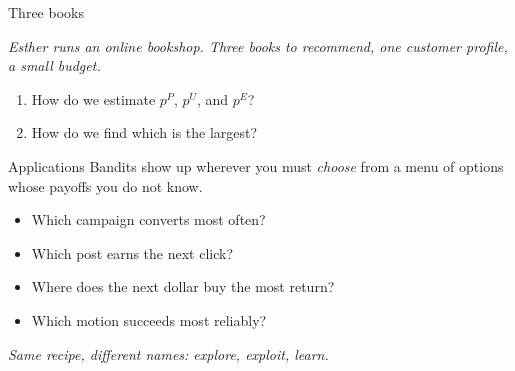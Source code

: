 \begin{frame}{Three books}
  \begin{center}
    {\scriptsize\itshape\color{mutedWarmGray}
     Esther runs an online bookshop.  Three books to recommend,
     one customer profile, a small budget.}
  \end{center}

  \smallskip
  \begin{center}
  \end{center}

  \smallskip
  \begin{enumerate}\setlength{\itemsep}{0pt}
    \item How do we estimate $p^P$, $p^U$, and $p^E$?
    \item How do we  find which is the largest?
  \end{enumerate}
\end{frame}

\begin{frame}{Applications}
  Bandits show up wherever you must \emph{choose} from a menu of
  options whose payoffs you do not know.

  \medskip
  \begin{itemize}
    \setlength{\itemsep}{0.55em}
    \item {}\quad
          Which campaign converts most often?
    \item {}\quad
          Which post earns the next click?
    \item {}\quad
          Where does the next dollar buy the most return?
    \item {}\quad
          Which motion succeeds most reliably?
  \end{itemize}

  \medskip
  \begin{center}
    \scriptsize\itshape\color{mutedWarmGray}
    Same recipe, different names: explore, exploit, learn.
  \end{center}
\end{frame}

